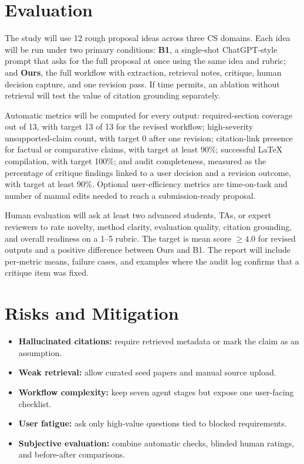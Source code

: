\documentclass[11pt]{article}
\begin{document}
\section*{Evaluation}
The study will use 12 rough proposal ideas across three CS domains. Each idea will be run under two primary conditions: \textbf{B1}, a single-shot ChatGPT-style prompt that asks for the full proposal at once using the same idea and rubric; and \textbf{Ours}, the full workflow with extraction, retrieval notes, critique, human decision capture, and one revision pass. If time permits, an ablation without retrieval will test the value of citation grounding separately.

Automatic metrics will be computed for every output: required-section coverage out of 13, with target 13 of 13 for the revised workflow; high-severity unsupported-claim count, with target 0 after one revision; citation-link presence for factual or comparative claims, with target at least 90\%; successful LaTeX compilation, with target 100\%; and audit completeness, measured as the percentage of critique findings linked to a user decision and a revision outcome, with target at least 90\%. Optional user-efficiency metrics are time-on-task and number of manual edits needed to reach a submission-ready proposal.

Human evaluation will ask at least two advanced students, TAs, or expert reviewers to rate novelty, method clarity, evaluation quality, citation grounding, and overall readiness on a 1--5 rubric. The target is mean score $\geq 4.0$ for revised outputs and a positive difference between Ours and B1. The report will include per-metric means, failure cases, and examples where the audit log confirms that a critique item was fixed.

\section*{Risks and Mitigation}
\begin{itemize}
\item \textbf{Hallucinated citations:} require retrieved metadata or mark the claim as an assumption.
\item \textbf{Weak retrieval:} allow curated seed papers and manual source upload.
\item \textbf{Workflow complexity:} keep seven agent stages but expose one user-facing checklist.
\item \textbf{User fatigue:} ask only high-value questions tied to blocked requirements.
\item \textbf{Subjective evaluation:} combine automatic checks, blinded human ratings, and before-after comparisons.
\end{itemize}
\end{document}
